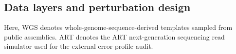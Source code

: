 \begin{table}[!tbp]
\centering
\scriptsize
\caption{Representation families and their prespecified diagnostic roles. The rows distinguish compact K/P/MSP block combinations, historical handcrafted descriptors, high-dimensional positional-readout references and the spaced-seed mechanism comparator. Interpretations specify the evidence assigned to each family on its corresponding audit axis.}
\label{tab:table1}

\end{table}


\subsection{Data layers and perturbation design}

Here, WGS denotes whole-genome-sequence-derived templates sampled from public assemblies.
ART denotes the ART next-generation sequencing read simulator used for the external error-profile audit.


